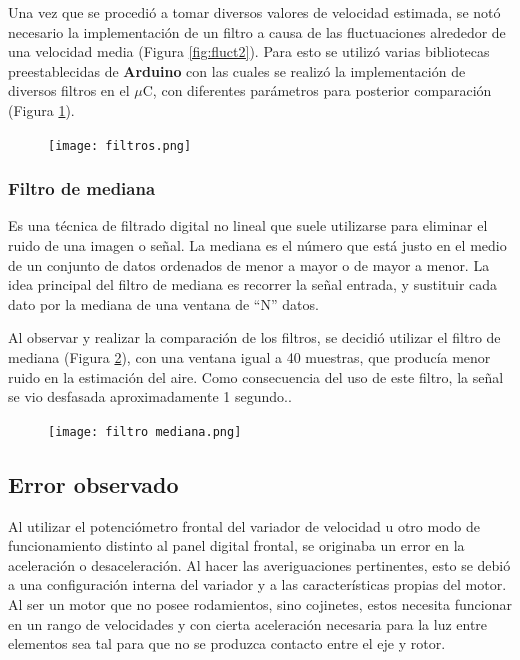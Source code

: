 Una vez que se procedió a tomar diversos valores de velocidad estimada, se notó necesario la implementación
de un filtro a causa de las fluctuaciones alrededor de una velocidad media (Figura \ref{fig:fluct2}). Para esto se utilizó varias bibliotecas preestablecidas de \textbf{Arduino} con las cuales se realizó la implementación de diversos filtros en el $\mu$C, con diferentes parámetros para posterior comparación (Figura \ref{fig:filtros}).


\begin{figure}[H]
	\centering
	\texttt{[image: filtros.png]}
	\label{fig:filtros}
\end{figure}


\subsubsection{Filtro de mediana}
\begin{tcolorbox}[colback=blue!5!white,colframe=blue!75!black,title=Mediana]
	Es una técnica de filtrado digital no lineal que suele utilizarse para eliminar el ruido de una imagen o señal. La mediana es el número que está justo en el medio de un conjunto de datos ordenados de menor a mayor o de mayor a menor.
	La idea principal del filtro de mediana es recorrer la señal entrada, y sustituir cada dato por la mediana de una ventana de “N” datos.
\end{tcolorbox}

Al observar y realizar la comparación de los filtros, se decidió utilizar el filtro de mediana (Figura \ref{fig:filtrosm}), con una ventana igual a 
40 muestras, que producía menor ruido en la estimación del aire. Como consecuencia del uso de este filtro, la señal se vio desfasada aproximadamente 1 segundo..

\begin{figure}[H]
	\centering
	\texttt{[image: filtro mediana.png]}
	\label{fig:filtrosm}
\end{figure}



\subsection{Error observado}\label{sec:error}
Al utilizar el potenciómetro frontal del variador de velocidad u otro modo de funcionamiento distinto al panel digital frontal, se originaba un error en la aceleración o desaceleración.  Al hacer las averiguaciones pertinentes, esto se debió a una configuración interna del
variador y a las características propias del motor. Al ser un motor que no posee rodamientos, sino cojinetes, estos necesita funcionar en un rango de velocidades y con cierta aceleración necesaria para la luz entre elementos sea tal para que no se produzca contacto entre el eje y rotor.


